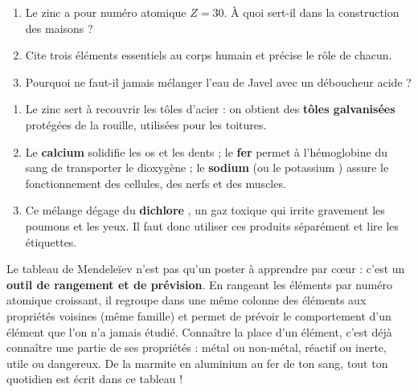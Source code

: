 \documentclass[11pt]{article}
\newcounter{popsec}
\newcounter{popsub}
\newcommand{\courssub}[1]{%
  \stepcounter{popsub}%
  \par\vspace{9pt}\noindent{\popxbold\fontsize{11.5}{13}\selectfont\color{popink}{\color{poporange}\thepopsec.\thepopsub}\hspace{6pt}#1}\par\nopagebreak\vspace{4pt}
}
\begin{document}
\begin{exercice}
\begin{enumerate}
\item Le zinc  a pour numéro atomique $Z = 30$. À quoi sert-il dans la construction des maisons ?
\item Cite trois éléments essentiels au corps humain et précise le rôle de chacun.
\item Pourquoi ne faut-il jamais mélanger l'eau de Javel avec un déboucheur acide ?
\end{enumerate}
\end{exercice}

\begin{corrige}
\begin{enumerate}
\item Le zinc sert à recouvrir les tôles d'acier : on obtient des \textbf{tôles galvanisées} protégées de la rouille, utilisées pour les toitures.
\item Le \textbf{calcium}  solidifie les os et les dents ; le \textbf{fer}  permet à l'hémoglobine du sang de transporter le dioxygène ; le \textbf{sodium}  (ou le potassium ) assure le fonctionnement des cellules, des nerfs et des muscles.
\item Ce mélange dégage du \textbf{dichlore} , un gaz toxique qui irrite gravement les poumons et les yeux. Il faut donc utiliser ces produits séparément et lire les étiquettes.
\end{enumerate}
\end{corrige}

\courssub{Bilan de la leçon}

\begin{aretenir}
Le tableau de Mendeleïev n'est pas qu'un poster à apprendre par cœur : c'est un \textbf{outil de rangement et de prévision}. En rangeant les éléments par numéro atomique croissant, il regroupe dans une même colonne des éléments aux propriétés voisines (même famille) et permet de prévoir le comportement d'un élément que l'on n'a jamais étudié. Connaître la place d'un élément, c'est déjà connaître une partie de ses propriétés : métal ou non-métal, réactif ou inerte, utile ou dangereux. De la marmite en aluminium au fer de ton sang, tout ton quotidien est écrit dans ce tableau !
\end{aretenir}

\newpage
\end{document}
